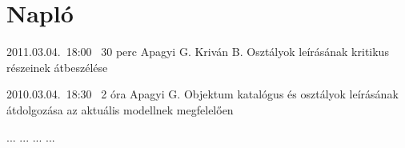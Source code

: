 %
\section{Napló}

\begin{naplo}

\bejegyzes
{2011.03.04.~18:00~} %
{30 perc} %
{Apagyi G.\newline
Kriván B.} %
{Osztályok leírásának kritikus részeinek átbeszélése} %

\bejegyzes
{2010.03.04.~18:30~}
{2 óra}
{Apagyi G.}
{Objektum katalógus és osztályok leírásának átdolgozása az aktuális modellnek megfelelően}

\bejegyzes
{...}
{...}
{...}
{...}


\end{naplo}

